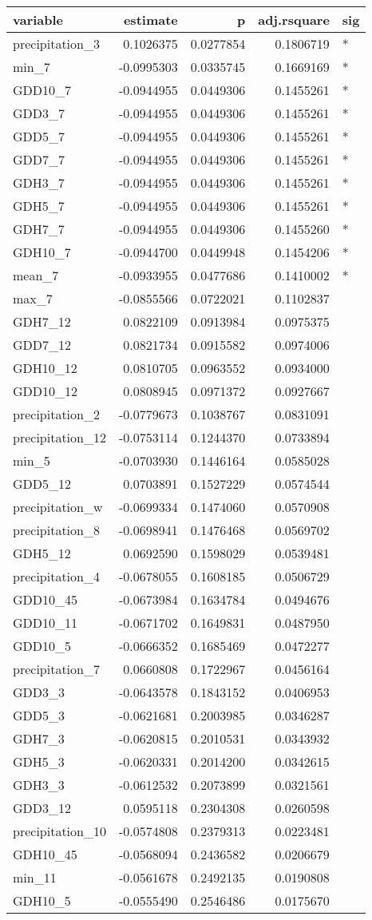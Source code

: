 \documentclass[]{article}
\begin{document}
\begin{longtable}[]{@{}lrrrl@{}}
\toprule
variable & estimate & p & adj.rsquare & sig\tabularnewline
\midrule
\endhead
precipitation\_3 & 0.1026375 & 0.0277854 & 0.1806719 & *\tabularnewline
min\_7 & -0.0995303 & 0.0335745 & 0.1669169 & *\tabularnewline
GDD10\_7 & -0.0944955 & 0.0449306 & 0.1455261 & *\tabularnewline
GDD3\_7 & -0.0944955 & 0.0449306 & 0.1455261 & *\tabularnewline
GDD5\_7 & -0.0944955 & 0.0449306 & 0.1455261 & *\tabularnewline
GDD7\_7 & -0.0944955 & 0.0449306 & 0.1455261 & *\tabularnewline
GDH3\_7 & -0.0944955 & 0.0449306 & 0.1455261 & *\tabularnewline
GDH5\_7 & -0.0944955 & 0.0449306 & 0.1455261 & *\tabularnewline
GDH7\_7 & -0.0944955 & 0.0449306 & 0.1455260 & *\tabularnewline
GDH10\_7 & -0.0944700 & 0.0449948 & 0.1454206 & *\tabularnewline
mean\_7 & -0.0933955 & 0.0477686 & 0.1410002 & *\tabularnewline
max\_7 & -0.0855566 & 0.0722021 & 0.1102837 &\tabularnewline
GDH7\_12 & 0.0822109 & 0.0913984 & 0.0975375 &\tabularnewline
GDD7\_12 & 0.0821734 & 0.0915582 & 0.0974006 &\tabularnewline
GDH10\_12 & 0.0810705 & 0.0963552 & 0.0934000 &\tabularnewline
GDD10\_12 & 0.0808945 & 0.0971372 & 0.0927667 &\tabularnewline
precipitation\_2 & -0.0779673 & 0.1038767 & 0.0831091 &\tabularnewline
precipitation\_12 & -0.0753114 & 0.1244370 & 0.0733894 &\tabularnewline
min\_5 & -0.0703930 & 0.1446164 & 0.0585028 &\tabularnewline
GDD5\_12 & 0.0703891 & 0.1527229 & 0.0574544 &\tabularnewline
precipitation\_w & -0.0699334 & 0.1474060 & 0.0570908 &\tabularnewline
precipitation\_8 & -0.0698941 & 0.1476468 & 0.0569702 &\tabularnewline
GDH5\_12 & 0.0692590 & 0.1598029 & 0.0539481 &\tabularnewline
precipitation\_4 & -0.0678055 & 0.1608185 & 0.0506729 &\tabularnewline
GDD10\_45 & -0.0673984 & 0.1634784 & 0.0494676 &\tabularnewline
GDD10\_11 & -0.0671702 & 0.1649831 & 0.0487950 &\tabularnewline
GDD10\_5 & -0.0666352 & 0.1685469 & 0.0472277 &\tabularnewline
precipitation\_7 & 0.0660808 & 0.1722967 & 0.0456164 &\tabularnewline
GDD3\_3 & -0.0643578 & 0.1843152 & 0.0406953 &\tabularnewline
GDD5\_3 & -0.0621681 & 0.2003985 & 0.0346287 &\tabularnewline
GDH7\_3 & -0.0620815 & 0.2010531 & 0.0343932 &\tabularnewline
GDH5\_3 & -0.0620331 & 0.2014200 & 0.0342615 &\tabularnewline
GDH3\_3 & -0.0612532 & 0.2073899 & 0.0321561 &\tabularnewline
GDD3\_12 & 0.0595118 & 0.2304308 & 0.0260598 &\tabularnewline
precipitation\_10 & -0.0574808 & 0.2379313 & 0.0223481 &\tabularnewline
GDH10\_45 & -0.0568094 & 0.2436582 & 0.0206679 &\tabularnewline
min\_11 & -0.0561678 & 0.2492135 & 0.0190808 &\tabularnewline
GDH10\_5 & -0.0555490 & 0.2546486 & 0.0175670 &\tabularnewline

\end{longtable}
\end{document}
